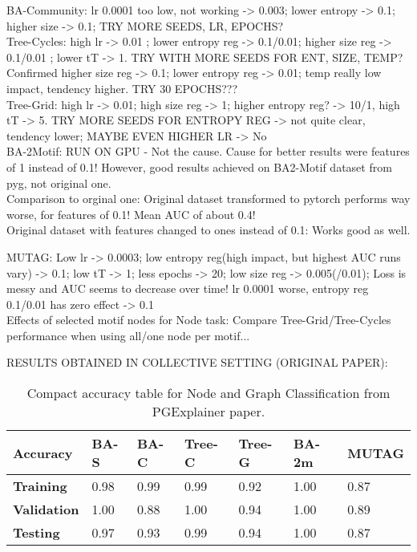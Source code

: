BA-Community: lr 0.0001 too low, not working -> 0.003; lower entropy -> 0.1; higher size -> 0.1; TRY MORE SEEDS, LR, EPOCHS? \\

Tree-Cycles: high lr -> 0.01 ; lower entropy reg -> 0.1/0.01; higher size reg -> 0.1/0.01 ; lower tT -> 1. TRY WITH MORE SEEDS FOR ENT, SIZE, TEMP? Confirmed higher size reg -> 0.1; lower entropy reg -> 0.01; temp really low impact, tendency higher. TRY 30 EPOCHS???\\

Tree-Grid: high lr -> 0.01; high size reg -> 1; higher entropy reg? -> 10/1, high tT -> 5. TRY MORE SEEDS FOR ENTROPY REG -> not quite clear, tendency lower; MAYBE EVEN HIGHER LR -> No\\

BA-2Motif: RUN ON GPU - Not the cause. Cause for better results were features of 1 instead of 0.1! However, good results achieved on BA2-Motif dataset from pyg, not original one.\\
Comparison to orginal one: Original dataset transformed to pytorch performs way worse, for features of 0.1! Mean AUC of about 0.4! \\
Original dataset with features changed to ones instead of 0.1: Works good as well.

MUTAG: Low lr -> 0.0003; low entropy reg(high impact, but highest AUC runs vary) -> 0.1; low tT -> 1; less epochs -> 20; low size reg -> 0.005(/0.01); Loss is messy and AUC seems to decrease over time! lr 0.0001 worse, entropy reg 0.1/0.01 has zero effect -> 0.1\\


 Effects of selected motif nodes for Node task: Compare Tree-Grid/Tree-Cycles performance when using all/one node per motif...





 RESULTS OBTAINED IN COLLECTIVE SETTING (ORIGINAL PAPER):

\begin{table}[h]
    \centering
    \scriptsize
    \begin{tabularx}{\linewidth}{l|X X X X|X X}
    \hline
    \textbf{Accuracy} & \textbf{BA-S} & \textbf{BA-C} & \textbf{Tree-C} & \textbf{Tree-G} & \textbf{BA-2m} & \textbf{MUTAG} \\
    \hline
    \textbf{Training}   & 0.98 & 0.99 & 0.99 & 0.92 & 1.00 & 0.87 \\
    \textbf{Validation} & 1.00 & 0.88 & 1.00 & 0.94 & 1.00 & 0.89 \\
    \textbf{Testing}    & 0.97 & 0.93 & 0.99 & 0.94 & 1.00 & 0.87 \\
    \hline
    \end{tabularx}
    \caption{Compact accuracy table for Node and Graph Classification from PGExplainer paper.}
    \label{tab:compact-accuracy}
\end{table}


